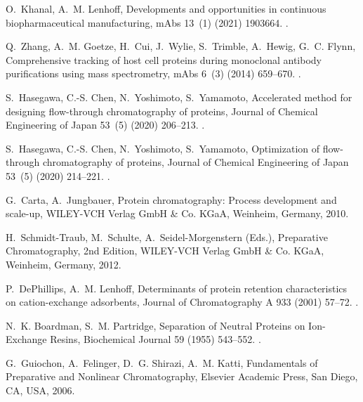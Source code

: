 \documentclass[preprint,review,12pt]{elsarticle}
\begin{document}
\begin{thebibliography}{10}
O.~Khanal, A.~M. Lenhoff, {Developments and opportunities in continuous
  biopharmaceutical manufacturing}, mAbs 13~(1) (2021) 1903664.
\newblock \href {https://doi.org/10.1080/19420862.2021.1903664}
  {}.

Q.~Zhang, A.~M. Goetze, H.~Cui, J.~Wylie, S.~Trimble, A.~Hewig, G.~C. Flynn,
  {Comprehensive tracking of host cell proteins during monoclonal antibody
  purifications using mass spectrometry}, mAbs 6~(3) (2014) 659--670.
\newblock \href {https://doi.org/10.4161/mabs.28120}
  {}.

S.~Hasegawa, C.-S. Chen, N.~Yoshimoto, S.~Yamamoto, {Accelerated method for
  designing flow-through chromatography of proteins}, Journal of Chemical
  Engineering of Japan 53~(5) (2020) 206--213.
\newblock \href {https://doi.org/10.1252/jcej.20we002}
  {}.

S.~Hasegawa, C.-S. Chen, N.~Yoshimoto, S.~Yamamoto, {Optimization of
  flow-through chromatography of proteins}, Journal of Chemical Engineering of
  Japan 53~(5) (2020) 214--221.
\newblock \href {https://doi.org/10.1252/jcej.20we003}
  {}.

G.~Carta, A.~Jungbauer, {Protein chromatography: Process development and
  scale-up}, WILEY-VCH Verlag GmbH \& Co. KGaA, Weinheim, Germany, 2010.

H.~Schmidt-Traub, M.~Schulte, A.~Seidel-Morgenstern (Eds.), {Preparative
  Chromatography}, 2nd Edition, WILEY-VCH Verlag GmbH \& Co. KGaA, Weinheim,
  Germany, 2012.

P.~DePhillips, A.~M. Lenhoff, {Determinants of protein retention
  characteristics on cation-exchange adsorbents}, Journal of Chromatography A
  933 (2001) 57--72.
\newblock \href {https://doi.org/10.1016/S0021-9673(01)01275-4}
  {}.

N.~K. Boardman, S.~M. Partridge, {Separation of Neutral Proteins on
  Ion-Exchange Resins}, Biochemical Journal 59 (1955) 543--552.
\newblock \href {https://doi.org/10.1038/171208a0}
  {}.

G.~Guiochon, A.~Felinger, D.~G. Shirazi, A.~M. Katti, {Fundamentals of
  Preparative and Nonlinear Chromatography}, Elsevier Academic Press, San
  Diego, CA, USA, 2006.


\end{thebibliography}
\end{document}

